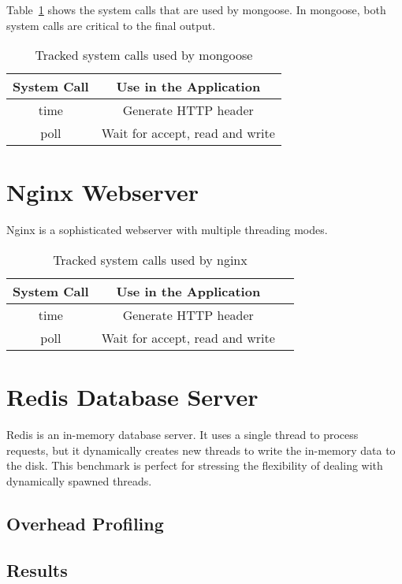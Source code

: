 Table~\ref{t:mongoose_syscall} shows the system calls that are used by mongoose. In mongoose, both system calls are critical to the final output.

\begin{table}
\caption{Tracked system calls used by mongoose}
\begin{center}
 \begin{tabular}{c | c}
System Call & Use in the Application\\ \hline
 time & Generate HTTP header  \\ \hline
 poll & Wait for accept, read and write
 \end{tabular}
\end{center}
\label{t:mongoose_syscall}
\end{table}

\section{Nginx Webserver}
Nginx is a sophisticated webserver with multiple threading modes.

\begin{table}
\caption{Tracked system calls used by nginx}
\begin{center}
 \begin{tabular}{c | c | c}
System Call & Use in the Application\\ \hline
 time & Generate HTTP header\\ \hline
 poll & Wait for accept, read and write\\ \hline 
 \end{tabular}
\end{center}
\label{t:nginx_syscall}
\end{table}


\section{Redis Database Server}
Redis is an in-memory database server. It uses a single thread to process requests, but it dynamically creates new threads to write the in-memory data to the disk. This benchmark is perfect for stressing the flexibility of dealing with dynamically spawned threads.

\subsection{Overhead Profiling}
\subsection{Results}

